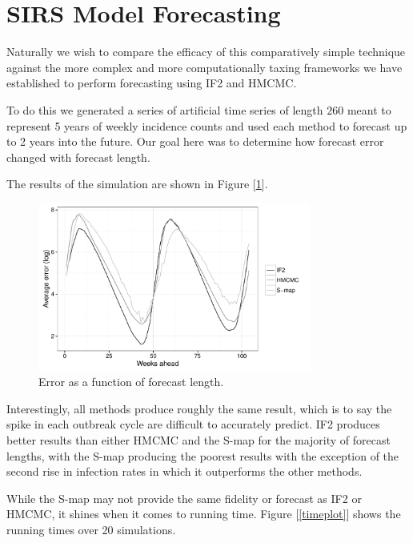 \section{SIRS Model Forecasting}

	Naturally we wish to compare the efficacy of this comparatively simple technique against the more complex and more computationally taxing frameworks we have established to perform forecasting using IF2 and HMCMC.

	To do this we generated a series of artificial time series of length $260$ meant to represent 5 years of weekly incidence counts and used each method to forecast up to 2 years into the future. Our goal here was to determine how forecast error changed with forecast length.

	The results of the simulation are shown in Figure [\ref{sseplot}].

	\begin{figure}
        \centering
        \captionsetup{width=.8\linewidth}
        \includegraphics[width=0.8\textwidth]{./images/sseplot.pdf}
        \caption{Error as a function of forecast length. \label{sseplot}}
    \end{figure}

    Interestingly, all methods produce roughly the same result, which is to say the spike in each outbreak cycle are difficult to accurately predict. IF2 produces better results than either HMCMC and the S-map for the majority of forecast lengths, with the S-map producing the poorest results with the exception of the second rise in infection rates in which it outperforms the other methods.

    While the S-map may not provide the same fidelity or forecast as IF2 or HMCMC, it shines when it comes to running time. Figure [\ref{timeplot}] shows the running times over 20 simulations.

